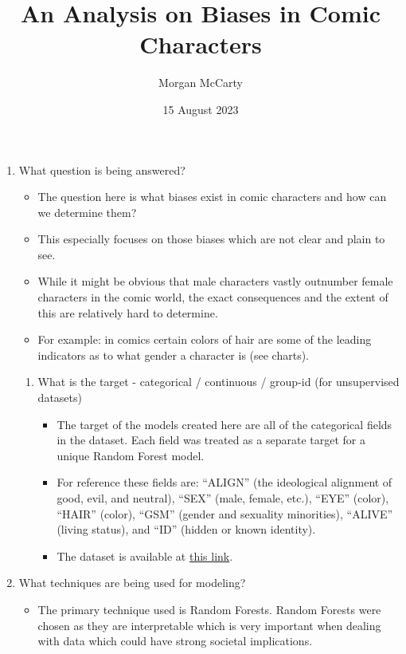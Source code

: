 \documentclass[12pt]{article}
\title{
    An Analysis on Biases in Comic Characters}
\author{Morgan McCarty}
\date{15 August 2023}
\begin{document}
    \maketitle
    \begin{enumerate}
        \item What question is being answered?
        \begin{itemize}
            \item The question here is what biases exist in comic characters and how can we determine them?
            \item This especially focuses on those biases which are not clear and plain to see.
            \item While it might be obvious that male characters vastly outnumber female characters in the comic world, the exact consequences and the extent of this are relatively hard to determine.
            \item For example: in comics certain colors of hair are some of the leading indicators as to what gender a character is (see charts).
        \end{itemize}
        \begin{enumerate}
            \item What is the target - categorical / continuous / group-id (for
            unsupervised datasets)
            \begin{itemize}
                \item The target of the models created here are all of the categorical fields in the dataset. Each field was treated as a separate target for a unique Random Forest model.
                \item For reference these fields are: ``ALIGN'' (the ideological alignment of good, evil, and neutral), ``SEX'' (male, female, etc.), ``EYE'' (color), ``HAIR'' (color), ``GSM'' (gender and sexuality minorities), ``ALIVE'' (living status), and ``ID'' (hidden or known identity).
                \item The dataset is available at \href{https://github.com/fivethirtyeight/data/tree/master/comic-characters}{this link}.
            \end{itemize}
        \end{enumerate}
        \item What techniques are being used for modeling?
        \begin{itemize}
            \item The primary technique used is Random Forests. Random Forests were chosen as they are interpretable which is very important when dealing with data which could have strong societal implications.

\end{itemize}
\end{enumerate}
\end{document}
